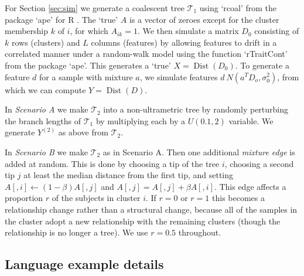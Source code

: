 \documentclass[a4]{article}
\newcommand{\+}[1]{\mathbf{#1}}
\newcommand{\dist}{\operatorname{Dist}}
\begin{document}


For Section \ref{sec:sim} we generate a coalescent tree $\mathcal{T}_1$ using `rcoal' from the package `ape' \cite{paradis2011package} for R \cite{Rproject}. The `true' $A$ is a vector of zeroes except for the cluster membership $k$ of $i$, for which $A_{ik}=1$. We then simulate a matrix $D_0$ consisting of $k$ rows (clusters) and  $L$ columns (features) by allowing features to drift in a correlated manner under a random-walk model using the function `rTraitCont' from the package `ape'. This generates a `true' $X=\dist(D_0)$. To generate a feature $d$ for a sample with mixture $a$, we simulate features $d~N(a^T D_o, \sigma_0^2)$, from which we can compute $Y=\dist(D)$.

In \emph{Scenario A} we make $\mathcal{T}_2$ into a non-ultrametric tree by randomly perturbing the branch lengths of $\mathcal{T}_1$ by multiplying each by a $U(0.1,2)$ variable. We generate $Y^{(2)}$ as above from $\mathcal{T}_2$.

In \emph{Scenario B} we make $\mathcal{T}_2$ as in Scenario A. Then one additional \emph{mixture edge} is added at random. This is done by choosing a tip of the tree $i$, choosing a second tip $j$ at least the median distance from the first tip, and setting $A[,i] \leftarrow (1-\beta) A[,j]$ and $A[,j]= A[,j] + \beta A[,i]$. This edge affects a proportion $r$ of the subjects in cluster $i$. If $r=0$ or $r=1$ this becomes a relationship change rather than a structural change, because all of the samples in the cluster adopt a new relationship with the remaining clusters (though the relationship is no longer a tree). We use $r=0.5$ throughout.

\subsection{Language example details}
\label{sec:methodsling}
\end{document}
